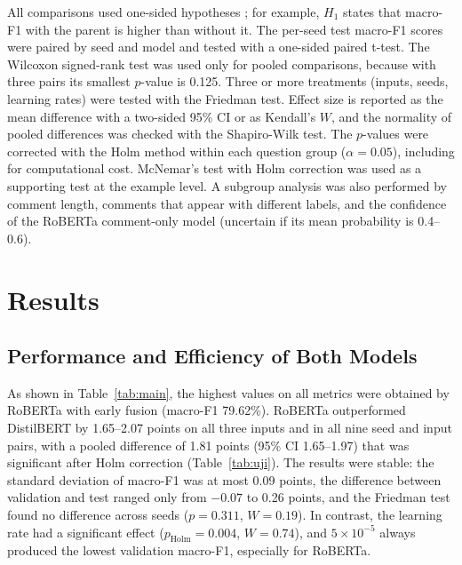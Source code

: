 \documentclass[conference]{IEEEtran}
\begin{document}
All comparisons used one-sided hypotheses \cite{dror2020significance}; for example, $H_1$ states that macro-F1 with the parent is higher than without it. The per-seed test macro-F1 scores were paired by seed and model and tested with a one-sided paired t-test. The Wilcoxon signed-rank test was used only for pooled comparisons, because with three pairs its smallest $p$-value is 0.125. Three or more treatments (inputs, seeds, learning rates) were tested with the Friedman test. Effect size is reported as the mean difference with a two-sided 95\% CI or as Kendall's $W$, and the normality of pooled differences was checked with the Shapiro-Wilk test. The $p$-values were corrected with the Holm method within each question group ($\alpha = 0.05$), including for computational cost. McNemar's test with Holm correction was used as a supporting test at the example level. A subgroup analysis was also performed by comment length, comments that appear with different labels, and the confidence of the RoBERTa comment-only model (uncertain if its mean probability is 0.4--0.6).

\section{Results}

\subsection{Performance and Efficiency of Both Models}
As shown in Table~\ref{tab:main}, the highest values on all metrics were obtained by RoBERTa with early fusion (macro-F1 79.62\%). RoBERTa outperformed DistilBERT by 1.65--2.07 points on all three inputs and in all nine seed and input pairs, with a pooled difference of 1.81 points (95\% CI 1.65--1.97) that was significant after Holm correction (Table~\ref{tab:uji}). The results were stable: the standard deviation of macro-F1 was at most 0.09 points, the difference between validation and test ranged only from $-0.07$ to 0.26 points, and the Friedman test found no difference across seeds ($p = 0.311$, $W = 0.19$). In contrast, the learning rate had a significant effect ($p_{\mathrm{Holm}} = 0.004$, $W = 0.74$), and $5 \times 10^{-5}$ always produced the lowest validation macro-F1, especially for RoBERTa.
\end{document}
